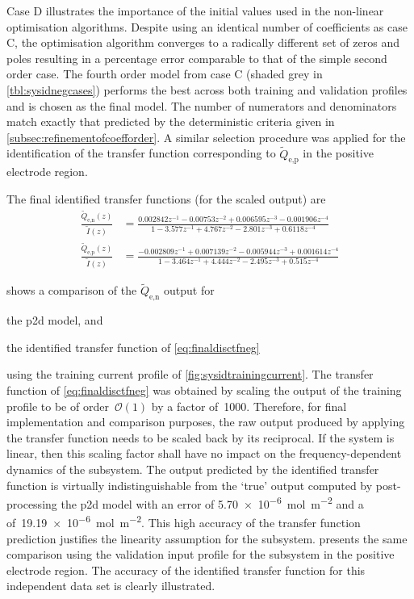 Case D illustrates  the importance of the initial values  used in the non-linear
optimisation algorithms.  Despite using an  identical number of  coefficients as
case C,  the optimisation algorithm  converges to  a radically different  set of
zeros  and  poles  resulting  in  a  percentage  error  comparable  to  that  of
the  simple second  order  case. The  fourth  order model  from  case C  (shaded
grey  in \cref{tbl:sysidnegcases}) performs  the best  across both  training and
validation profiles and  is chosen as the final model.  The number of numerators
and  denominators match  exactly that  predicted by  the deterministic  criteria
given in \cref{subsec:refinementofcoefforder}. A similar selection procedure was
applied  for  the  identification  of the  transfer  function  corresponding  to
$\widetilde{Q}_{\text{e,p}}$ in the positive electrode region.

The final identified transfer functions (for the scaled output) are
\begin{align}
    \frac{\widetilde{Q}_{\text{e,n}}(z)}{\widetilde{I}(z)} & = \frac{0.002842 z^{-1} - 0.00753 z^{-2} + 0.006595 z^{-3} - 0.001906 z^{-4}}{1 - 3.577 z^{-1} + 4.767 z^{-2} - 2.801 z^{-3} + 0.6118 z^{-4}} \label{eq:finaldisctfneg}\\
    \frac{\widetilde{Q}_{\text{e,p}}(z)}{\widetilde{I}(z)} & = \frac{-0.002809 z^{-1} + 0.007139 z^{-2} - 0.005944 z^{-3} + 0.001614 z^{-4}}{1 - 3.464 z^{-1} + 4.444 z^{-2} - 2.495 z^{-3} + 0.515 z^{-4}}\label{eq:finaldisctfpos}
\end{align}


 shows a comparison of the $\widetilde{Q}_{\text{e,n}}$
output for
\begin{enumerate*}[label=\emph{\alph*})]
    \item the \gls{p2d} model, and
    \item the identified transfer function of \cref{eq:finaldisctfneg}
\end{enumerate*}
using  the  training  current  profile  of \cref{fig:sysidtrainingcurrent}.  The
transfer function of \cref{eq:finaldisctfneg} was obtained by scaling the output
of the  training profile to  be of order~$\mathcal{O}(1)$  by a factor  of~1000.
Therefore,  for final  implementation and  comparison purposes,  the raw  output
produced  by applying  the transfer  function  needs to  be scaled  back by  its
reciprocal. If  the system  is linear,  then this scaling  factor shall  have no
impact  on  the  frequency-dependent  dynamics  of  the  subsystem.  The  output
predicted  by the  identified transfer  function is  virtually indistinguishable
from  the `true'  output computed  by post-processing  the \gls{p2d}  model with
an    error   of  \SI{5.70e-6}{\mole\per\meter\squared}  and  a
 of~\SI{19.19e-6}{\mole\per\meter\squared}.  This high accuracy
of the transfer  function prediction justifies the linearity  assumption for the
subsystem.    presents  the  same  comparison  using  the
validation input profile for the subsystem in the positive electrode region. The
accuracy of  the identified transfer function  for this independent data  set is
clearly illustrated.

